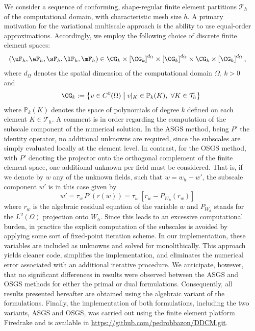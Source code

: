 We consider a sequence of conforming, shape-regular finite element partitions $\mathcal{T}_h$ of the computational domain, with characteristic mesh size $h$. A primary motivation for the variational multiscale approach is the ability to use equal-order approximations. Accordingly, we employ the following choice of discrete finite element spaces:
\begin{equation*}\label{eq:equal_order_func_spaces}
	\left(\uF_{h}, \eF_{h}, \sF_{h}, \lF_{h}, \mF_{h}\right)
	\in
	\CG_{k} \times \left[\CG_{k}\right]^{d_{\Omega}}
	\times \left[\CG_{k}\right]^{d_{\Omega}}
	\times \CG_{k}
	\times \left[\CG_{k}\right]^{d_{\Omega}},
\end{equation*}
where $d_{\Omega}$ denotes the spatial dimension of the computational domain $\Omega$, $k>0$ and 
\begin{equation*}
	\quad \CG_{k} := \left\{ v \in C^0(\Omega) \;\middle|\; v|_K \in \mathbb{P}_k(K),\ \forall K \in \mathcal{T}_h \right\}	
\end{equation*}
where $\mathbb{P}_k(K)$ denotes the space of polynomials of degree $k$ defined on each element $K \in \mathcal{T}_h$.
A comment is in order regarding the computation of the subscale component of the numerical
solution. In the ASGS method, being $P'$ the identity operator, no additional unknowns are
required, since the subscales are simply evaluated locally at the element level. In contrast, 
for the OSGS method, with $P'$ denoting the projector onto the orthogonal complement of the 
finite element space, one additional unknown per field must be considered.
That is, if we denote by $w$ any of the unknown fields, such that $w = w_h + w'$, 
the subscale component $w'$ is in this case given by
\begin{equation}
w' = \tau_w \, P' \left ( r(w) \right ) = \tau_w \, \left [ r_w - P_{W_{h}} \left ( r_w \right ) \right ]
\end{equation}
where $r_w$ is the algebraic residual equation of the variable $w$ and $P_{W_{h}}$ stands for the $L^2(\Omega)$ projection onto $W_h$.
Since this leads to an excessive computational burden, in practice the explicit computation 
of the subscales is avoided by applying some sort of fixed-point iteration scheme. 
In our implementation, these variables are included as unknowns and solved for 
monolithically. This approach yields cleaner code, simplifies the implementation, 
and eliminates the numerical error associated with an additional iterative procedure. 
We anticipate, however, that no significant differences in results were observed between the 
ASGS and OSGS methods for either the primal or dual formulations. 
Consequently, all results presented hereafter are obtained using the algebraic variant 
of the formulations. Finally, the implementation of both formulations, including the two variants,
ASGS and OSGS, was carried out using the finite element platform Firedrake \cite{FiredrakeUserManual} and is available in \url{https://github.com/pedrobbazon/DDCM.git}.

